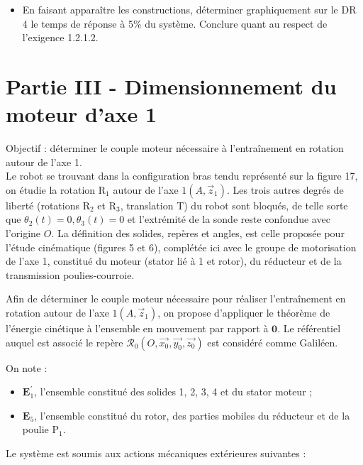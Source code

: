 \begin{itemize}
  \item[Q24.] En faisant apparaître les constructions, déterminer graphiquement sur le DR 4 le temps de réponse à 5\% du système. Conclure quant au respect de l'exigence 1.2.1.2.
\end{itemize}

\section*{Partie III - Dimensionnement du moteur d'axe 1}
Objectif : déterminer le couple moteur nécessaire à l'entraînement en rotation autour de l'axe 1.\\
Le robot se trouvant dans la configuration bras tendu représenté sur la figure 17, on étudie la rotation $\mathrm{R}_{1}$ autour de l'axe $1\left(A, \vec{z}_{1}\right)$. Les trois autres degrés de liberté (rotations $\mathrm{R}_{2}$ et $\mathrm{R}_{3}$, translation T) du robot sont bloqués, de telle sorte que $\theta_{2}(t)=0, \theta_{3}(t)=0$ et l'extrémité de la sonde reste confondue avec l'origine $O$. La définition des solides, repères et angles, est celle proposée pour l'étude cinématique (figures 5 et 6), complétée ici avec le groupe de motorisation de l'axe 1, constitué du moteur (stator lié à 1 et rotor), du réducteur et de la transmission poulies-courroie.

Afin de déterminer le couple moteur nécessaire pour réaliser l'entraînement en rotation autour de l'axe $1\left(A, \vec{z}_{1}\right)$, on propose d'appliquer le théorème de l'énergie cinétique à l'ensemble en mouvement par rapport à $\mathbf{0}$. Le référentiel auquel est associé le repère $\mathcal{R}_{0}\left(O, \overrightarrow{x_{0}}, \overrightarrow{y_{0}}, \overrightarrow{z_{0}}\right)$ est considéré comme Galiléen.

On note :

\begin{itemize}
  \item[-] $\boldsymbol{E}_{1}^{\prime}$, l'ensemble constitué des solides 1, 2, 3, 4 et du stator moteur ;
  \item[-] $\boldsymbol{E}_{5}$, l'ensemble constitué du rotor, des parties mobiles du réducteur et de la poulie $\mathrm{P}_{1}$.
\end{itemize}

Le système est soumis aux actions mécaniques extérieures suivantes :

